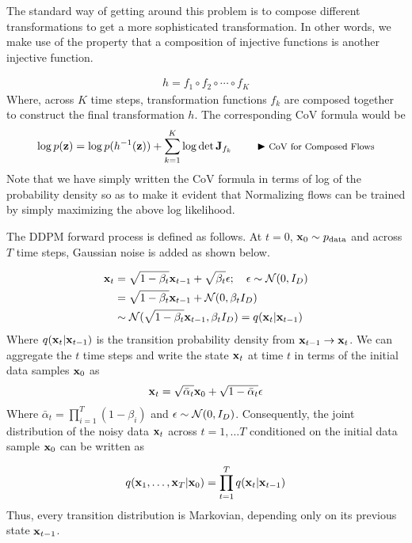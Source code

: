 \documentclass[a4paper, 11pt]{article}
\begin{document}
The standard way of getting around this problem is to compose different transformations to get a more sophisticated transformation. In other words, we make use of the property that a composition of injective functions is another injective function. 

\begin{align}
    h = f_1 \circ f_2 \circ  \cdots \circ f_K
\end{align}
Where, across $K$ time steps, transformation functions $f_k$ are composed together to construct the final transformation $h$. The corresponding CoV formula would be
\begin{align}
\log p(\mbox{$\mbox{$\mathbf{z}$}$}) = \log p(h^{-1}(\mbox{$\mbox{$\mathbf{z}$}$})) + \sum_{k=1}^K \log \det \mbox{$\mbox{$\mathbf{J}$}$}_{f_k} \qquad \blacktriangleright\text{\footnotesize CoV for Composed Flows} \label{eq:cov-loglik}
\end{align}
Note that we have simply written the CoV formula in terms of log of the probability density so as to make it evident that Normalizing flows can be trained by simply maximizing the above log likelihood.

The DDPM forward process is defined as follows. At $t=0$, $\mbox{$\mbox{$\mathbf{x}$}$}_0 \sim p_{\text{data}}$ and across $T$ time steps, Gaussian noise is added as shown below.

\begin{align}
    \mbox{$\mbox{$\mathbf{x}$}$}_t &= \sqrt{1-\beta_t} \mbox{$\mbox{$\mathbf{x}$}$}_{t-1} + \sqrt{\beta_t}\epsilon; \quad \epsilon \sim \mbox{$\cal N$}(0, I_D) \\
    &= \sqrt{1-\beta_t} \mbox{$\mbox{$\mathbf{x}$}$}_{t-1} + \mbox{$\cal N$}(0, \beta_t I_D) \\
    &\sim \mbox{$\cal N$}(\sqrt{1-\beta_t} \mbox{$\mbox{$\mathbf{x}$}$}_{t-1}, \beta_t I_D) = q(\mbox{$\mbox{$\mathbf{x}$}$}_t | \mbox{$\mbox{$\mathbf{x}$}$}_{t-1})
\end{align}
Where $q(\mbox{$\mbox{$\mathbf{x}$}$}_t | \mbox{$\mbox{$\mathbf{x}$}$}_{t-1})$ is the transition probability density from $\mbox{$\mbox{$\mathbf{x}$}$}_{t-1} \to \mbox{$\mbox{$\mathbf{x}$}$}_t$. We can aggregate the $t$ time steps and write the state $\mbox{$\mbox{$\mathbf{x}$}$}_t$ at time $t$ in terms of the initial data samples $\mbox{$\mbox{$\mathbf{x}$}$}_0$ as
\begin{align}
    \mbox{$\mbox{$\mathbf{x}$}$}_t = \sqrt{\bar{\alpha}_t} \mbox{$\mbox{$\mathbf{x}$}$}_0 + \sqrt{1 - \bar{\alpha}_t} \epsilon
\end{align}
Where $\bar{\alpha}_t = \prod_{i=1}^T (1 -\beta_i)$ and $\epsilon \sim \mbox{$\cal N$}(0, I_D)$. Consequently, the joint distribution of the noisy data $\mbox{$\mbox{$\mathbf{x}$}$}_t$ across $t = 1, \ldots T$ conditioned on the initial data sample $\mbox{$\mbox{$\mathbf{x}$}$}_0$ can be written as

\begin{align}
    q(\mbox{$\mbox{$\mathbf{x}$}$}_1, \ldots, \mbox{$\mbox{$\mathbf{x}$}$}_T | \mbox{$\mbox{$\mathbf{x}$}$}_0) = \prod_{t=1}^T q(\mbox{$\mbox{$\mathbf{x}$}$}_t | \mbox{$\mbox{$\mathbf{x}$}$}_{t-1})
\end{align}
Thus, every transition distribution is Markovian, depending only on its previous state $\mbox{$\mbox{$\mathbf{x}$}$}_{t-1}$.
\end{document}
